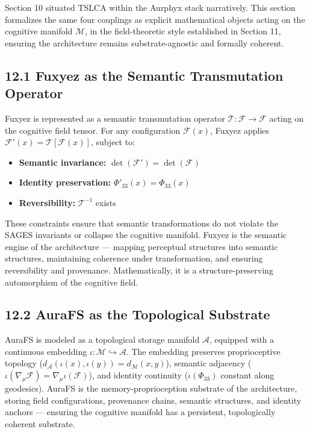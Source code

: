 Section 10 situated TSLCA within the Aurphyx stack narratively. This section formalizes the same four couplings as explicit mathematical objects acting on the cognitive manifold \(\mathcal{M}\), in the field-theoretic style established in Section 11, ensuring the architecture remains substrate-agnostic and formally coherent.

\subsection{12.1 Fuxyez as the Semantic Transmutation Operator}\label{fuxyez-as-the-semantic-transmutation-operator}

Fuxyez is represented as a semantic transmutation operator \(\mathcal{T} : \mathcal{F} \rightarrow \mathcal{F}\) acting on the cognitive field tensor. For any configuration \(\mathcal{F}(x)\), Fuxyez applies \(\mathcal{F}'(x) = \mathcal{T}[\mathcal{F}(x)]\), subject to:

\begin{itemize}
\tightlist
\item
  \textbf{Semantic invariance:} \(\det(\mathcal{F}') = \det(\mathcal{F})\)
\item
  \textbf{Identity preservation:} \(\Phi'_{33}(x) = \Phi_{33}(x)\)
\item
  \textbf{Reversibility:} \(\mathcal{T}^{-1}\) exists
\end{itemize}

These constraints ensure that semantic transformations do not violate the SAGES invariants or collapse the cognitive manifold. Fuxyez is the semantic engine of the architecture --- mapping perceptual structures into semantic structures, maintaining coherence under transformation, and ensuring reversibility and provenance. Mathematically, it is a structure-preserving automorphism of the cognitive field.

\subsection{12.2 AuraFS as the Topological Substrate}\label{aurafs-as-the-topological-substrate}

AuraFS is modeled as a topological storage manifold \(\mathcal{A}\), equipped with a continuous embedding \(\iota : \mathcal{M} \hookrightarrow \mathcal{A}\). The embedding preserves proprioceptive topology (\(d_{\mathcal{A}}(\iota(x), \iota(y)) = d_{\mathcal{M}}(x,y)\)), semantic adjacency (\(\iota(\nabla_{\mu} \mathcal{F}) = \nabla_{\mu} \iota(\mathcal{F})\)), and identity continuity (\(\iota(\Phi_{33})\) constant along geodesics). AuraFS is the memory-proprioception substrate of the architecture, storing field configurations, provenance chains, semantic structures, and identity anchors --- ensuring the cognitive manifold has a persistent, topologically coherent substrate.

